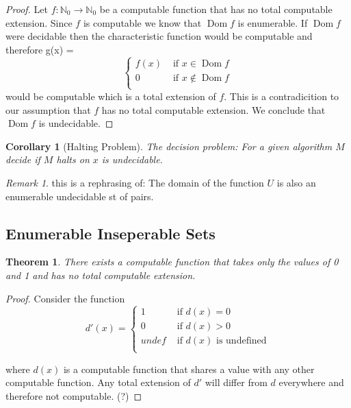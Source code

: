 \documentclass[10pt, letterpaper]{article}
\newcommand{\N}{\mathbb{N}}
\newtheorem{thm}{Theorem}
\newtheorem{cor}{Corollary}
\theoremstyle{remark}
\newtheorem{rem}{Remark}
\theoremstyle{definition}
\begin{document}
    \begin{proof}
        Let $f:\N_0 \rightarrow \N_0$ be a computable function that has no total computable extension. Since $f$ is 
        computable we know that $\operatorname{Dom} f$ is enumerable. If $\operatorname{Dom} f$ were decidable then the 
        characteristic function would be computable and therefore
        g(x) = \[
            \begin{cases}
                f(x) & \text{ if } x \in \operatorname{Dom} f \\
                0 & \text{ if } x \notin \operatorname{Dom} f \\
            \end{cases}
        \]
        would be computable which is a total extension of $f$. This is a contradicition to our assumption that $f$ has no 
        total computable extension. We conclude that $\operatorname{Dom} f$ is undecidable.
    \end{proof}

    \begin{cor}[Halting Problem]
        The decision problem: For a given algorithm $M$ decide if $M$ halts on $x$ is undecidable.
    \end{cor}

    \begin{rem}
        this is a rephrasing of: The domain of the function $U$ is also an enumerable undecidable st of pairs.
    \end{rem}

    \subsection*{Enumerable Inseperable Sets}

    \begin{thm}
        There exists a computable function that takes only the values of 0 and 1 and has no total computable extension.
    \end{thm}

    \begin{proof}
        Consider the function 
        \[
            d'(x) = \begin{cases}
                1 &\text{ if } d(x) = 0 \\
                0 &\text{ if } d(x) > 0 \\
                undef &\text{ if } d(x) \text{ is undefined} \\
            \end{cases}
        \]

        where $d(x)$ is a computable function that shares a value with any other computable function. Any total 
        extension of $d'$ will differ from $d$ everywhere and therefore not computable. (?)
    \end{proof}
\end{document}
